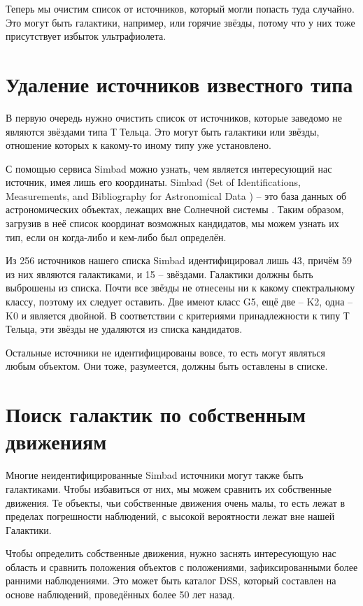 Теперь мы очистим список от источников, который могли попасть туда случайно. Это могут быть галактики, например, или горячие звёзды, потому что у них тоже присутствует избыток ультрафиолета.

\section{Удаление источников известного типа}
В первую очередь нужно очистить список от источников, которые заведомо не являются звёздами типа Т Тельца. Это могут быть галактики или звёзды, отношение которых к какому-то иному типу уже установлено.

С помощью сервиса Simbad можно узнать, чем является интересующий нас источник, имея лишь его координаты. Simbad (Set of Identifications, Measurements, and Bibliography for Astronomical Data ) -- это база данных об астрономических объектах, лежащих вне Солнечной системы \cite{wenger2000simbad}. Таким образом, загрузив в неё список координат возможных кандидатов, мы можем узнать их тип, если он когда-либо и кем-либо был определён.

Из 256 источников нашего списка Simbad идентифицировал лишь 43, причём 59 из них являются галактиками, и 15 -- звёздами. Галактики должны быть выброшены из списка. Почти все звёзды не отнесены ни к какому спектральному классу, поэтому их следует оставить. Две имеют класс G5, ещё две -- K2, одна -- K0 и является двойной. В соответствии с критериями принадлежности к типу Т Тельца, эти звёзды не удаляются из списка кандидатов.

Остальные источники не идентифицированы вовсе, то есть могут являться любым объектом. Они тоже, разумеется, должны быть оставлены в списке.

\section{Поиск галактик по собственным движениям}
Многие неидентифицированные Simbad источники могут также быть галактиками. Чтобы избавиться от них, мы можем сравнить их собственные движения. Те объекты, чьи собственные движения очень малы, то есть лежат в пределах погрешности наблюдений, с высокой вероятности лежат вне нашей Галактики.

Чтобы определить собственные движения, нужно заснять интересующую нас область и сравнить положения объектов с положениями, зафиксированными более ранними наблюдениями. Это может быть каталог DSS, который составлен на основе наблюдений, проведённых более 50 лет назад.

